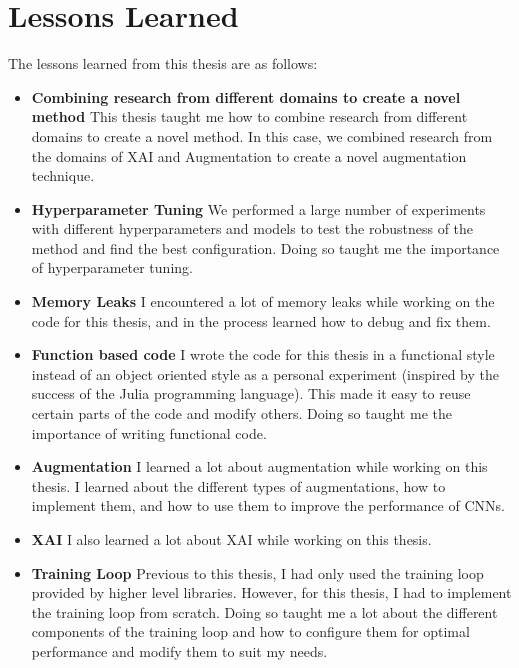 \section{Lessons Learned}
The lessons learned from this thesis are as follows:
\begin{itemize}
    \item \textbf{Combining research from different domains to create a novel method} This thesis taught me how to combine research from different domains to create a novel method. In this case, we combined research from the domains of XAI and Augmentation to create a novel augmentation technique.
    \item \textbf{Hyperparameter Tuning} We performed a large number of experiments with different hyperparameters and models to test the robustness of the method and find the best configuration. Doing so taught me the importance of hyperparameter tuning.
    \item \textbf{Memory Leaks} I encountered a lot of memory leaks while working on the code for this thesis, and in the process learned how to debug and fix them. 
    \item \textbf{Function based code} I wrote the code for this thesis in a functional style instead of an object oriented style as a personal experiment (inspired by the success of the Julia programming language). This made it easy to reuse certain parts of the code and modify others. Doing so taught me the importance of writing functional code.
    \item \textbf{Augmentation} I learned a lot about augmentation while working on this thesis. I learned about the different types of augmentations, how to implement them, and how to use them to improve the performance of CNNs.
    \item \textbf{XAI} I also learned a lot about XAI while working on this thesis. 
    \item \textbf{Training Loop} Previous to this thesis, I had only used the training loop provided by higher level libraries. However, for this thesis, I had to implement the training loop from scratch. Doing so taught me a lot about the different components of the training loop and how to configure them for optimal performance and modify them to suit my needs.
\end{itemize}

